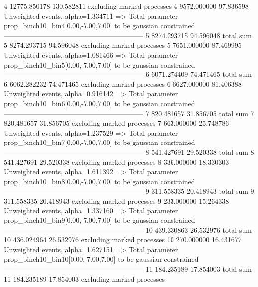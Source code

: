 4          12775.850178    130.582811      excluding marked processes    
4          9572.000000     97.836598       Unweighted events, alpha=1.334711
  => Total parameter prop_binch10_bin4[0.00,-7.00,7.00] to be gaussian constrained
------------------------------------------------------------
5          8274.293715     94.596048       total sum                     
5          8274.293715     94.596048       excluding marked processes    
5          7651.000000     87.469995       Unweighted events, alpha=1.081466
  => Total parameter prop_binch10_bin5[0.00,-7.00,7.00] to be gaussian constrained
------------------------------------------------------------
6          6071.274409     74.471465       total sum                     
6          6062.282232     74.471465       excluding marked processes    
6          6627.000000     81.406388       Unweighted events, alpha=0.916142
  => Total parameter prop_binch10_bin6[0.00,-7.00,7.00] to be gaussian constrained
------------------------------------------------------------
7          820.481657      31.856705       total sum                     
7          820.481657      31.856705       excluding marked processes    
7          663.000000      25.748786       Unweighted events, alpha=1.237529
  => Total parameter prop_binch10_bin7[0.00,-7.00,7.00] to be gaussian constrained
------------------------------------------------------------
8          541.427691      29.520338       total sum                     
8          541.427691      29.520338       excluding marked processes    
8          336.000000      18.330303       Unweighted events, alpha=1.611392
  => Total parameter prop_binch10_bin8[0.00,-7.00,7.00] to be gaussian constrained
------------------------------------------------------------
9          311.558335      20.418943       total sum                     
9          311.558335      20.418943       excluding marked processes    
9          233.000000      15.264338       Unweighted events, alpha=1.337160
  => Total parameter prop_binch10_bin9[0.00,-7.00,7.00] to be gaussian constrained
------------------------------------------------------------
10         439.330863      26.532976       total sum                     
10         436.024964      26.532976       excluding marked processes    
10         270.000000      16.431677       Unweighted events, alpha=1.627151
  => Total parameter prop_binch10_bin10[0.00,-7.00,7.00] to be gaussian constrained
------------------------------------------------------------
11         184.235189      17.854003       total sum                     
11         184.235189      17.854003       excluding marked processes    
